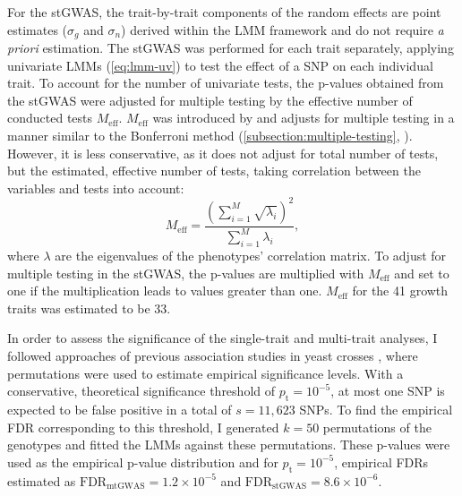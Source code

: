 For the stGWAS, the trait-by-trait components of the random effects are point estimates (\(\sigma_g\) and \(\sigma_n\)) derived within the LMM framework and do not require \textit{a priori} estimation. The stGWAS was performed for each trait separately, applying univariate LMMs (\cref{eq:lmm-uv}) to test the effect of a SNP on each individual trait. To account for the number of univariate tests, the p-values obtained from the stGWAS were adjusted for multiple testing by the effective number of conducted tests \(M_\text{eff}\). \(M_\text{eff}\) was introduced by \citet{Galwey2009} and adjusts for multiple testing in a manner similar to the Bonferroni method (\cref{subsection:multiple-testing}, \citep{Dunn1961}). However, it is less conservative, as it does not adjust for total number of tests, but the estimated, effective number of tests, taking correlation between the 
variables and tests into account:
\begin{equation}
 M_\text{eff} = \frac{(\sum^M_{i=1} \sqrt{\lambda_i})^2}{\sum^M_{i=1}\lambda_i},
 \label{eq:meff}
\end{equation}
 where \(\lambda\) are the eigenvalues of the phenotypes' correlation matrix. To adjust for multiple testing in the stGWAS, the p-values are multiplied with \(M_\text{eff}\) and set to one if the multiplication leads to values greater than one. \(M_\text{eff}\) for the \num{41} growth traits was estimated to be \num{33}. 
 
In order to assess the significance of the single-trait and multi-trait analyses, I followed approaches of previous association studies in yeast crosses \citep{Brem2002,Brem2005,Ehrenreich2010}, where permutations were used to estimate empirical significance levels. With a conservative, theoretical significance threshold of \(p_\text{t}=10^{-5}\), at most one SNP is expected to be false positive in a total of \(s = 11,623\) SNPs. To find the empirical FDR corresponding to this threshold, I generated \(k = 50\) permutations of the genotypes and fitted the LMMs against these permutations. These p-values were used as the empirical p-value distribution and for \(p_\text{t}=10^{-5}\), empirical FDRs estimated as 
\(\text{FDR}_{\text{mtGWAS}} =1.2 \times 10^{-5}\) and \(\text{FDR}_{\text{stGWAS}} =8.6 \times 10^{-6}\).

